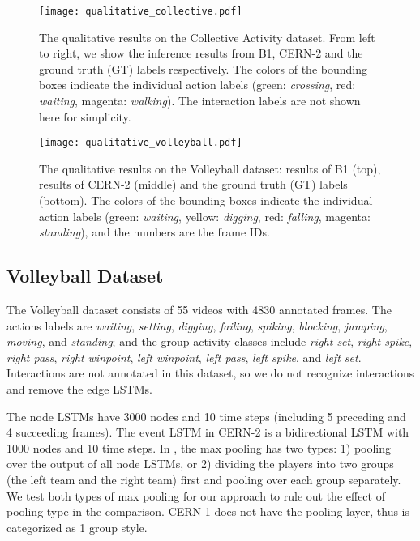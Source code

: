 \documentclass[10pt,twocolumn,letterpaper]{article}
\begin{document}
   
      \begin{figure*}[t!]
      \centering
      \texttt{[image: qualitative\_collective.pdf]}
      \caption{The qualitative results on the Collective Activity dataset. From left to right, we show the inference results from B1, CERN-2 and the ground truth (GT) labels respectively. The colors of the bounding boxes indicate the individual action labels (green: \textit{crossing}, red: \textit{waiting}, magenta: \textit{walking}). The interaction labels are not shown here for simplicity.}
      \label{fig:qualitative_collective}
   \end{figure*}
   
         \begin{figure*}[t!]
      \centering
      \texttt{[image: qualitative\_volleyball.pdf]}
      \caption{The qualitative results on the Volleyball dataset: results of B1 (top), results of CERN-2 (middle) and the ground truth (GT) labels (bottom). The colors of the bounding boxes indicate the individual action labels (green: \textit{waiting}, yellow: \textit{digging}, red: \textit{falling}, magenta: \textit{standing}), and the numbers are the frame IDs.}
      \label{fig:qualitative_volleyball}
   \end{figure*}


\subsection{Volleyball Dataset}

The Volleyball dataset consists of 55 videos with 4830 annotated frames. The actions labels are \textit{waiting}, \textit{setting}, \textit{digging}, \textit{failing}, \textit{spiking}, \textit{blocking}, \textit{jumping}, \textit{moving}, and \textit{standing}; and the group activity classes include \textit{right set}, \textit{right spike}, \textit{right pass}, \textit{right winpoint}, \textit{left winpoint}, \textit{left pass}, \textit{left spike}, and \textit{left set}. Interactions are not annotated in this dataset, so we do not recognize interactions and remove the edge LSTMs.

The node LSTMs have 3000 nodes and 10 time steps (including 5 preceding and 4 succeeding frames). The event LSTM in CERN-2 is a bidirectional LSTM with 1000 nodes and 10 time steps. In \cite{Ibrahim2016}, the max pooling has two types: 1) pooling over the output of all node LSTMs, or 2) dividing the players into two groups (the left team and the right team) first and pooling over each group separately. We test both types of max pooling for our approach to rule out the effect of pooling type in the comparison. CERN-1 does not have the pooling layer, thus is categorized as 1 group style. %
\end{document}
